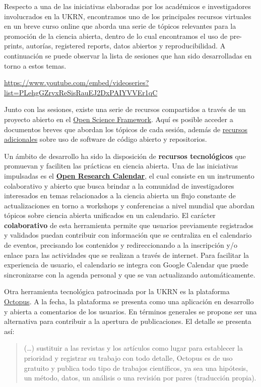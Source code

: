 \documentclass[
  spanish,
  a4paper,
  oneside]{scrbook}
\begin{document}
Respecto a una de las iniciativas elaboradas por los académicos e
investigadores involucrados en la UKRN, encontramos uno de los
principales recursos virtuales en un breve curso online que aborda una
serie de tópicos relevantes para la promoción de la ciencia abierta,
dentro de lo cual encontramos el uso de pre-prints, autorías, registered
reports, datos abiertos y reproducibilidad. A continuación se puede
observar la lista de sesiones que han sido desarrolladas en torno a
estos temas.

\url{https://www.youtube.com/embed/videoseries?list=PLehgGZrvxReSisRauEJ2DxPAIYVVEr1qC}

Junto con las sesiones, existe una serie de recursos compartidos a
través de un proyecto abierto en el \href{https://osf.io/x8j9q/}{Open
Science Framework}. Aquí es posible acceder a documentos breves que
abordan los tópicos de cada sesión, además de
\href{https://osf.io/qw9ck/}{recursos adicionales} sobre uso de software
de código abierto y repositorios.

Un ámbito de desarrollo ha sido la disposición de \textbf{recursos
tecnológicos} que promuevan y faciliten las prácticas en ciencia
abierta. Una de las iniciativas impulsadas es el
\href{https://openresearchcalendar.org/}{\textbf{Open Research
Calendar}}, el cual consiste en un instrumento colaborativo y abierto
que busca brindar a la comunidad de investigadores interesados en temas
relacionados a la ciencia abierta un flujo constante de actualizaciones
en torno a workshops y conferencias a nivel mundial que abordan tópicos
sobre ciencia abierta unificados en un calendario. El carácter
\textbf{colaborativo} de esta herramienta permite que usuarios
previamente registrados y validados puedan contribuir con información
que se centraliza en el calendario de eventos, precisando los contenidos
y redireccionando a la inscripción y/o enlace para las actividades que
se realizan a través de internet. Para facilitar la experiencia de
usuario, el calendario se integra con Google Calendar que puede
sincronizarse con la agenda personal y que se van actualizando
automáticamente.

Otra herramienta tecnológica patrocinada por la UKRN es la plataforma
\href{https://science-octopus.org/}{Octopus}. A la fecha, la plataforma
se presenta como una aplicación en desarrollo y abierta a comentarios de
los usuarios. En términos generales se propone ser una alternativa para
contribuir a la apertura de publicaciones. El detalle se presenta así:

\begin{quote}
(\ldots) sustituir a las revistas y los artículos como lugar para
establecer la prioridad y registrar su trabajo con todo detalle, Octopus
es de uso gratuito y publica todo tipo de trabajos científicos, ya sea
una hipótesis, un método, datos, un análisis o una revisión por pares
(traducción propia).
\end{quote}
\end{document}
